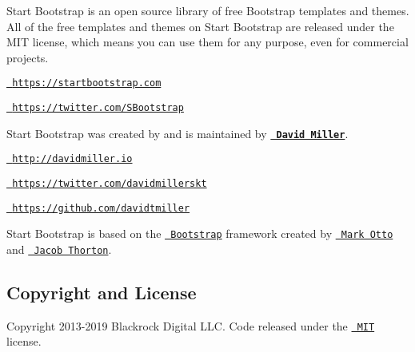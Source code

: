 Start Bootstrap is an open source library of free Bootstrap templates and themes. All of the free templates and themes on Start Bootstrap are released under the M\+IT license, which means you can use them for any purpose, even for commercial projects.


\begin{DoxyItemize}
\item \href{https://startbootstrap.com}{\texttt{ https\+://startbootstrap.\+com}}
\item \href{https://twitter.com/SBootstrap}{\texttt{ https\+://twitter.\+com/\+S\+Bootstrap}}
\end{DoxyItemize}

Start Bootstrap was created by and is maintained by {\bfseries{\href{http://davidmiller.io/}{\texttt{ David Miller}}}}.


\begin{DoxyItemize}
\item \href{http://davidmiller.io}{\texttt{ http\+://davidmiller.\+io}}
\item \href{https://twitter.com/davidmillerskt}{\texttt{ https\+://twitter.\+com/davidmillerskt}}
\item \href{https://github.com/davidtmiller}{\texttt{ https\+://github.\+com/davidtmiller}}
\end{DoxyItemize}

Start Bootstrap is based on the \href{http://getbootstrap.com/}{\texttt{ Bootstrap}} framework created by \href{https://twitter.com/mdo}{\texttt{ Mark Otto}} and \href{https://twitter.com/fat}{\texttt{ Jacob Thorton}}.

\subsection*{Copyright and License}

Copyright 2013-\/2019 Blackrock Digital L\+LC. Code released under the \href{https://github.com/BlackrockDigital/startbootstrap-resume/blob/gh-pages/LICENSE}{\texttt{ M\+IT}} license. 
